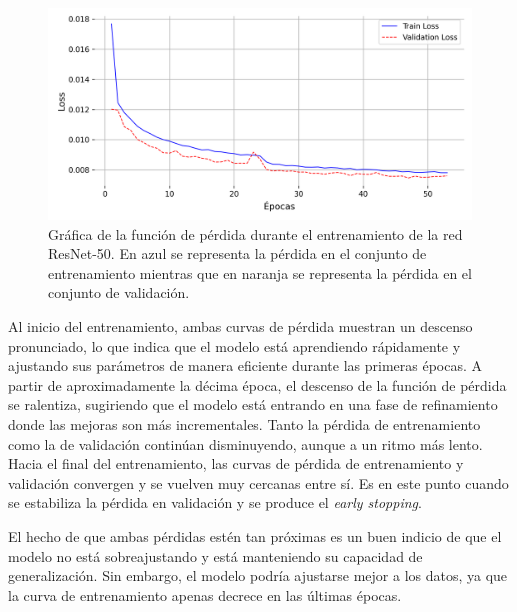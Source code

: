 \begin{figure}[h]
	\centering
	\includegraphics[scale=0.6]{imagenes/cap5/train_loss_resnet.png}
	\caption[Gráfica de pérdida ResNet-50.]{Gráfica de la función de pérdida durante el entrenamiento de la red ResNet-50. En azul se representa la pérdida en el conjunto de entrenamiento mientras que en naranja se representa la pérdida en el conjunto de validación.}
	\label{fig31}
\end{figure}

Al inicio del entrenamiento, ambas curvas de pérdida muestran un descenso pronunciado, lo que indica que el modelo está aprendiendo rápidamente y ajustando sus parámetros de manera eficiente durante las primeras épocas. A partir de aproximadamente la décima época, el descenso de la función de pérdida se ralentiza, sugiriendo que el modelo está entrando en una fase de refinamiento donde las mejoras son más incrementales. Tanto la pérdida de entrenamiento como la de validación continúan disminuyendo, aunque a un ritmo más lento. Hacia el final del entrenamiento, las curvas de pérdida de entrenamiento y validación convergen y se vuelven muy cercanas entre sí. Es en este punto cuando se estabiliza la pérdida en validación y se produce el \textit{early stopping}.

El hecho de que ambas pérdidas estén tan próximas es un buen indicio de que el modelo no está sobreajustando y está manteniendo su capacidad de generalización. Sin embargo, el modelo podría ajustarse mejor a los datos, ya que la curva de entrenamiento apenas decrece en las últimas épocas.

